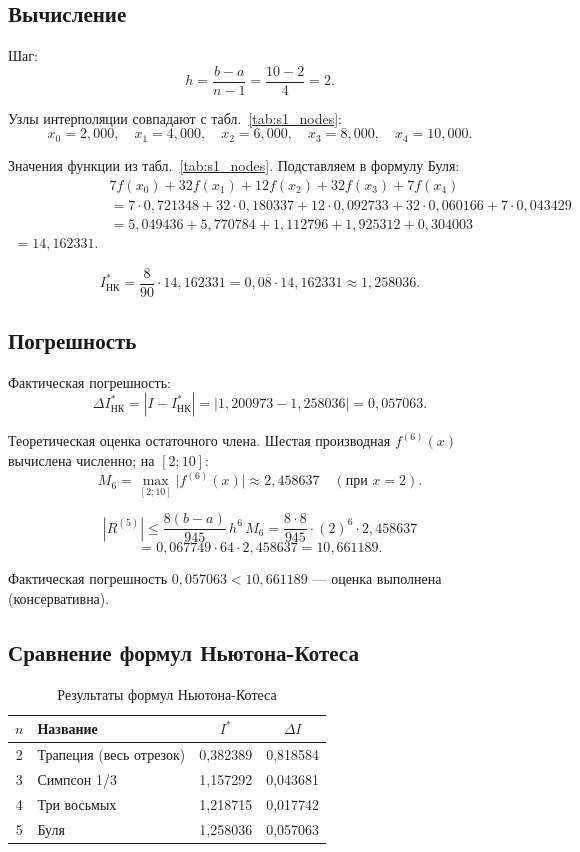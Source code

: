 \documentclass[a4paper, final]{article}
\begin{document}
\subsection{Вычисление}

Шаг:
\[
h = \frac{b-a}{n-1} = \frac{10-2}{4} = 2.
\]

Узлы интерполяции совпадают с табл.~\ref{tab:s1_nodes}:
\[
x_0 = 2{,}000,\quad x_1 = 4{,}000,\quad x_2 = 6{,}000,
\quad x_3 = 8{,}000,\quad x_4 = 10{,}000.
\]

Значения функции из табл.~\ref{tab:s1_nodes}. Подставляем в формулу Буля:
\begin{align*}
&7f(x_0)+32f(x_1)+12f(x_2)+32f(x_3)+7f(x_4)\\
&= 7\cdot0{,}721348 + 32\cdot0{,}180337 + 12\cdot0{,}092733
   + 32\cdot0{,}060166 + 7\cdot0{,}043429\\
&= 5{,}049436 + 5{,}770784 + 1{,}112796 + 1{,}925312 + 0{,}304003\\
 = 14{,}162331.
\end{align*}

\[
\boxed{I^*_\text{НК} = \frac{8}{90}\cdot 14{,}162331
= 0{,}0\overline{8}\cdot 14{,}162331 \approx 1{,}258036.}
\]

\subsection{Погрешность}

Фактическая погрешность:
\[
\Delta I^*_\text{НК} = |I - I^*_\text{НК}| = |1{,}200973 - 1{,}258036| = 0{,}057063.
\]

Теоретическая оценка остаточного члена. Шестая производная $f^{(6)}(x)$
вычислена численно; на $[2; 10]$:
\[
M_6 = \max_{[2;10]}\bigl|f^{(6)}(x)\bigr| \approx 2{,}458637 \quad (\text{при }x=2).
\]

\[
|R^{(5)}| \leq \frac{8(b-a)}{945}\,h^6\,M_6
= \frac{8\cdot 8}{945}\cdot(2)^6\cdot 2{,}458637\]
\[= 0{,}067749\cdot 64\cdot 2{,}458637 = 10{,}661189.
\]

Фактическая погрешность $0{,}057063 < 10{,}661189$ --- оценка выполнена (консервативна).

\subsection{Сравнение формул Ньютона-Котеса}

\begin{table}[h!]
\centering
\caption{Результаты формул Ньютона-Котеса}
\label{tab:nc_comp}
\begin{tabular}{|c|l|c|c|}
\hline
$n$ & Название & $I^*$ & $\Delta I$ \\
\hline
2 & Трапеция (весь отрезок) & 0,382389 & 0,818584 \\
3 & Симпсон 1/3              & 1,157292 & 0,043681 \\
4 & Три восьмых              & 1,218715 & 0,017742 \\
5 & Буля                     & 1,258036 & 0,057063 \\
\hline
\end{tabular}
\end{table}
\end{document}
